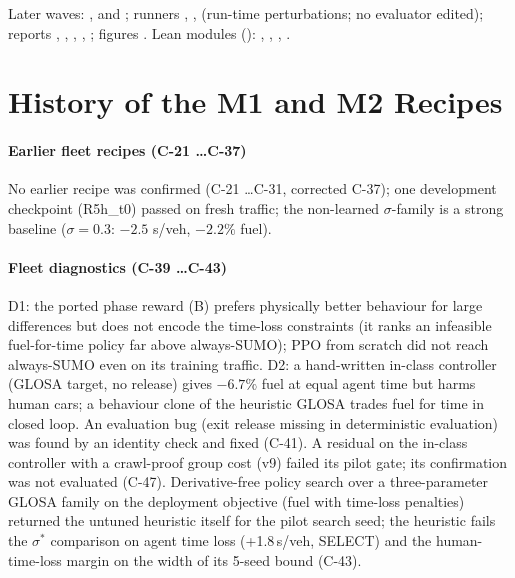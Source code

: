 {\sloppy\noindent Later waves: ,  and
; runners , ,  (run-time
perturbations; no evaluator edited); reports , , ,
, ; figures . Lean modules ():
, , , .\par}


\section{History of the M1 and M2 Recipes}\label{app:history}
\paragraph{Earlier fleet recipes (C-21 \dots C-37)} No earlier recipe was confirmed (C-21 \dots C-31, corrected C-37); one development checkpoint (R5h\_t0)
passed on fresh traffic; the non-learned $\sigma$-family is a strong baseline ($\sigma=0.3$: $-2.5$ s/veh, $-2.2\%$ fuel).
\paragraph{Fleet diagnostics (C-39 \dots C-43)} D1: the ported phase reward (B) prefers physically better behaviour for large
differences but does not encode the time-loss constraints (it ranks an infeasible fuel-for-time policy far above always-SUMO); PPO from
scratch did not reach always-SUMO even on its training traffic. D2: a hand-written in-class controller (GLOSA target, no release) gives
$-6.7\%$ fuel at equal agent time but harms human cars; a behaviour clone of the heuristic GLOSA trades fuel for time in closed loop.
An evaluation bug (exit release missing in deterministic evaluation) was found by an identity check and fixed (C-41).
A residual on the in-class controller with a crawl-proof group cost (v9) failed its pilot gate; its confirmation was not evaluated (C-47).
Derivative-free policy search over a three-parameter GLOSA family on the deployment objective (fuel with time-loss penalties) returned
the untuned heuristic itself for the pilot search seed; the heuristic fails the $\sigma^*$ comparison on agent time loss (+1.8\,s/veh,
SELECT) and the human-time-loss margin on the width of its 5-seed bound (C-43).

